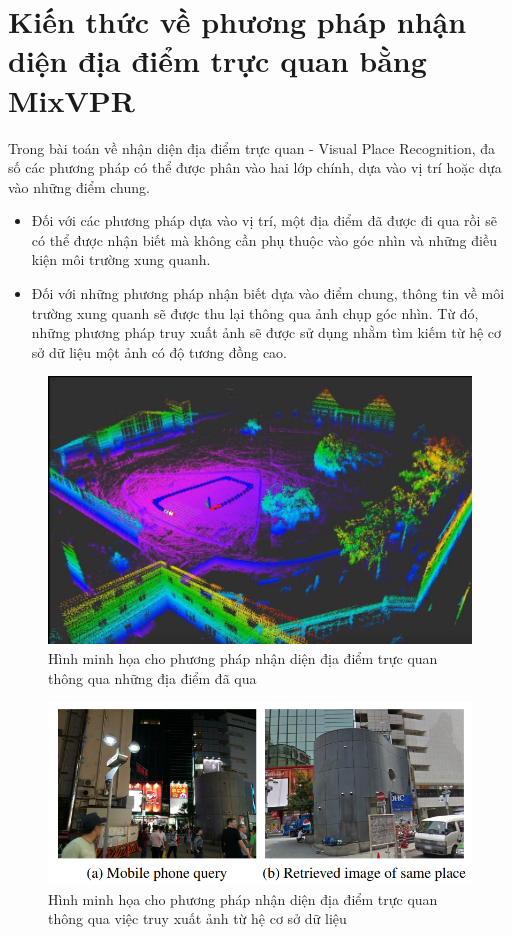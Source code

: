 \section{Kiến thức về phương pháp nhận diện địa điểm trực quan bằng MixVPR}
Trong bài toán về nhận diện địa điểm trực quan - Visual Place Recognition, đa số các phương pháp có thể được phân vào hai lớp chính, dựa vào vị trí hoặc dựa vào những điểm chung\cite{yin2022general}.
\begin{itemize}
  \item Đối với các phương pháp dựa vào vị trí, một địa điểm đã được đi qua rồi sẽ có thể được nhận biết mà không cần phụ thuộc vào góc nhìn và những điều kiện môi trường xung quanh.
  \item Đối với những phương pháp nhận biết dựa vào điểm chung, thông tin về môi trường xung quanh sẽ được thu lại thông qua ảnh chụp góc nhìn. Từ đó, những phương pháp truy xuất ảnh sẽ được sử dụng nhằm tìm kiếm từ hệ cơ sở dữ liệu một ảnh có độ tương đồng cao.
\end{itemize}
\begin{figure}[H]
  \centering
  \includegraphics[scale=0.4]{pics/Chapter3/position-based.png}
  \caption{Hình minh họa cho phương pháp nhận diện địa điểm trực quan thông qua những địa điểm đã qua \cite{slamposition}}
  \label{fig:enter-label}
\end{figure}
\begin{figure}[H]
  \centering
  \includegraphics[scale=0.7]{pics/Chapter3/overlap-based.png}
  \caption{Hình minh họa cho phương pháp nhận diện địa điểm trực quan thông qua việc truy xuất ảnh từ hệ cơ sở dữ liệu \cite{arandjelovic2016netvlad}}
  \label{fig:enter-label}
\end{figure}

